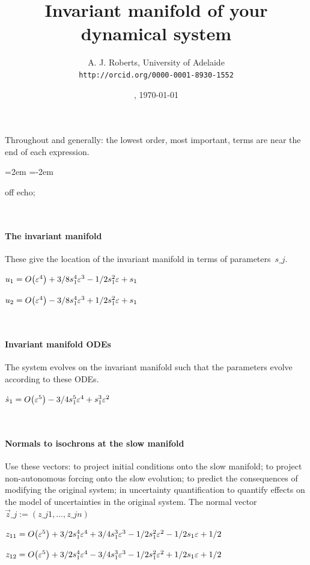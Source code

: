 \documentclass[11pt,a5paper]{article}
\title{Invariant manifold of your dynamical system}
\author{A. J. Roberts, University of Adelaide\\
\texttt{http://orcid.org/0000-0001-8930-1552}}
\date{\now, \today}
\begin{document}
\maketitle
Throughout and generally: the lowest order, most
important, terms are near the end of each expression.
\par\leftskip=2em  \parindent=-2em


off echo;

\(
\)
\paragraph{The invariant manifold}
These give the location of the invariant manifold in
terms of parameters~\(s\_ j\).
\(
\)\par
\(u_{1}=O\big(\varepsilon ^{4}\big)+3/8 s_{1}^{4} \varepsilon^{3}-1/2 s_{1}^{2} 
\varepsilon+s_{1}
\)\par
\(u_{2}=O\big(\varepsilon ^{4}\big)-3/8 s_{1}^{4} \varepsilon^{3}+1/2 s_{1}^{2} 
\varepsilon+s_{1}
\)\par
\(
\)
\paragraph{Invariant manifold ODEs}
The system evolves on the invariant manifold such
that the parameters evolve according to these ODEs.
\(
\)\par
\(\dot s_{1}=O\big(\varepsilon ^{5}\big)-3/4 s_{1}^{5} \varepsilon^{4}+s_{1}^{3} 
\varepsilon^{2}
\)\par
\(
\)
\paragraph{Normals to isochrons at the slow manifold}
Use these vectors: to project initial conditions
onto the slow manifold; to project non-autonomous
forcing onto the slow evolution; to predict the
consequences of modifying the original system; in
uncertainty quantification to quantify effects on
the model of uncertainties in the original system.
The normal vector \(\vec z\_j:=(z\_{j1},\ldots,z\_{jn})\)
\(
\)\par
\(z_{11}=O\big(\varepsilon ^{5}\big)+3/2 s_{1}^{4} \varepsilon^{4}+3/4 s_{1}^{3} 
\varepsilon^{3}-1/2 s_{1}^{2} \varepsilon^{2}-1/2 s_{1} \varepsilon+1/2
\)\par
\(z_{12}=O\big(\varepsilon ^{5}\big)+3/2 s_{1}^{4} \varepsilon^{4}-3/4 s_{1}^{3} 
\varepsilon^{3}-1/2 s_{1}^{2} \varepsilon^{2}+1/2 s_{1} \varepsilon+1/2
\)\par
\(
\)\par
\end{document}
